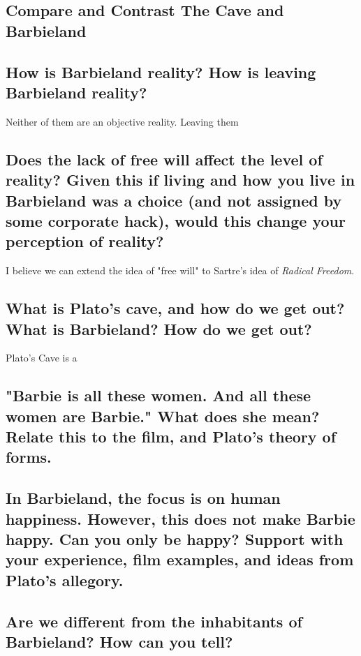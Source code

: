 
\subsection{Compare and Contrast The Cave and Barbieland}

\subsection{How is Barbieland reality? How is leaving Barbieland reality?}

Neither of them are an objective reality. Leaving them 

\subsection{Does the lack of free will affect the level of reality? Given this if living and
how you live in Barbieland was a choice (and not assigned by some corporate hack), would this change
your perception of reality?}

I believe we can extend the idea of "free will" to Sartre's idea of \textit{Radical Freedom}.

\subsection{What is Plato's cave, and how do we get out? What is Barbieland? How do we get out?}

Plato's Cave is a 

\subsection{"Barbie is all these women. And all these women are Barbie." What does she mean?
Relate this to the film, and Plato's theory of forms.}

\subsection{In Barbieland, the focus is on human happiness. However, this does not make Barbie happy.
Can you only be happy? Support with your experience, film examples, and ideas from Plato's allegory.}

\subsection{Are we different from the inhabitants of Barbieland? How can you tell?}
